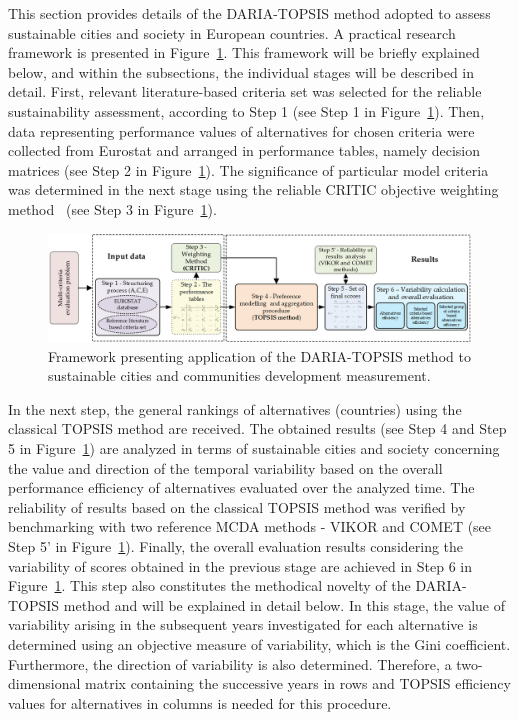 \documentclass[final,5p,times,twocolumn,authoryear]{elsarticle}
\begin{document}
This section provides details of the DARIA-TOPSIS method adopted to assess sustainable cities and society in European countries. A practical research framework is presented in Figure~\ref{fig:practicalFramework}. This framework will be briefly explained below, and within the subsections, the individual stages will be described in detail. First, relevant literature-based criteria set was selected for the reliable sustainability assessment, according to Step 1 (see Step 1 in Figure~\ref{fig:practicalFramework}). Then, data representing performance values of alternatives for chosen criteria were collected from Eurostat and arranged in performance tables, namely decision matrices (see Step 2 in Figure~\ref{fig:practicalFramework}). The significance of particular model criteria was determined in the next stage using the reliable CRITIC objective weighting method~\citep{vzivzovic2020objective} (see Step 3 in Figure~\ref{fig:practicalFramework}). 
%
\begin{figure}[ht!]
    \centering
    \includegraphics[width=\linewidth]{SCSpractical.png}
    \caption{Framework presenting application of the DARIA-TOPSIS method to sustainable cities and communities development measurement.}
    \label{fig:practicalFramework}
\end{figure}
%
In the next step, the general rankings of alternatives (countries) using the classical TOPSIS method are received. The obtained results (see Step 4 and Step 5 in Figure~\ref{fig:practicalFramework}) are analyzed in terms of sustainable cities and society concerning the value and direction of the temporal variability based on the overall performance efficiency of alternatives evaluated over the analyzed time. The reliability of results based on the classical TOPSIS method was verified by benchmarking with two reference MCDA methods - VIKOR and COMET (see Step 5' in Figure~\ref{fig:practicalFramework}). Finally, the overall evaluation results considering the variability of scores obtained in the previous stage are achieved in Step 6 in Figure~\ref{fig:practicalFramework}. This step also constitutes the methodical novelty of the DARIA-TOPSIS method and will be explained in detail below. In this stage, the value of variability arising in the subsequent years investigated for each alternative is determined using an objective measure of variability, which is the Gini coefficient. Furthermore, the direction of variability is also determined. Therefore, a two-dimensional matrix containing the successive years in rows and TOPSIS efficiency values for alternatives in columns is needed for this procedure. 
\end{document}

